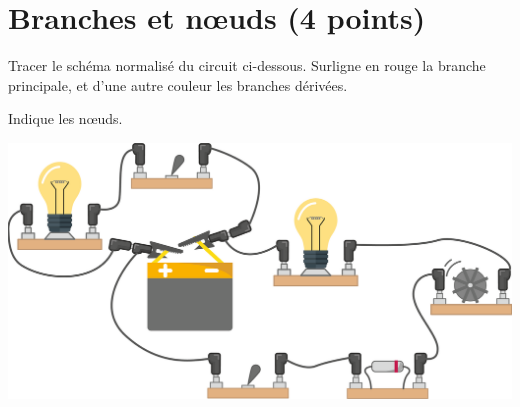 \section{Branches et n\oe uds (4 points)}

\begin{questions}
	\question Tracer le schéma normalisé du circuit ci-dessous.
	\question Surligne en rouge la branche principale, et d'une autre couleur les branches dérivées.
	
	\question Indique les n\oe uds.
\end{questions}

\begin{center}
	\includegraphics[scale=0.3]{img/ex18}
\end{center}